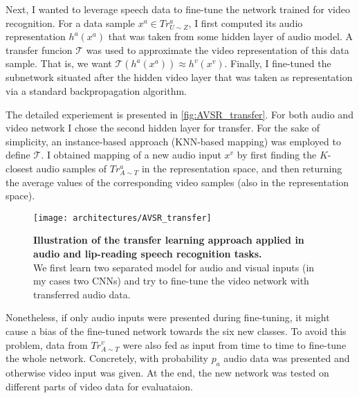 Next, I wanted to leverage speech data to fine-tune the network trained for
video recognition. For a data sample $x^a\in Tr_{U\sim Z}^a$, I first
computed its audio representation $h^a(x^a)$ that was taken from some
hidden layer of audio model. A transfer funcion $\mathcal{T}$ was used
to approximate the video representation of this data sample.
That is, we want $\mathcal{T}(h^a(x^a))\approx h^v(x^v)$. Finally, I
fine-tuned the subnetwork situated after the hidden video layer that
was taken as representation via a standard backpropagation algorithm.

The detailed experiement is presented in \autoref{fig:AVSR_transfer}.
For both audio and video network I chose the second hidden layer for
transfer. For the sake of simplicity, an instance-based approach
(KNN-based mapping) was employed to define $\mathcal{T}$.
I obtained mapping of a new audio
input $x^v$ by first finding the $K$-closest audio samples of
$Tr_{A\sim T}^a$ in the representation space, and then returning the
average values of the corresponding video samples
(also in the representation space).

\begin{figure}[H]
  \centering
  \texttt{[image: architectures/AVSR\_transfer]}
  \caption{%
    \textbf{Illustration of the transfer learning approach applied in
      audio and lip-reading speech recognition tasks.}\\[0.1em]
    We first learn two separated model for audio and visual inputs
      (in my cases two CNNs) and try to fine-tune the video network
      with transferred audio data.
    }
  \label{fig:AVSR_transfer}
\end{figure}

Nonetheless, if only audio inputs were presented during fine-tuning, it
might cause a bias of the fine-tuned network towards the six new classes.
To avoid this problem, data from $Tr_{A\sim T}^v$ were also fed as input
from time to time to fine-tune the whole network. Concretely, with
probability $p_a$ audio data was presented and otherwise video input
was given. At the end, the new network was tested on different parts of
video data for evaluataion.

